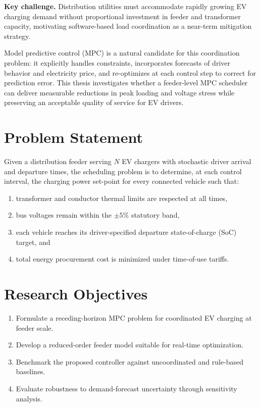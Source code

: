 \documentclass[12pt,twoside]{report}
\begin{document}
\begin{tcolorbox}[colback=kfupmsand,colframe=kfupmgreen,boxrule=0.6pt,arc=2pt,left=8pt,right=8pt,top=6pt,bottom=6pt]
\small\textbf{Key challenge.} Distribution utilities must accommodate rapidly growing EV
charging demand without proportional investment in feeder and transformer capacity, motivating
software-based load coordination as a near-term mitigation strategy.
\end{tcolorbox}

Model predictive control (MPC) is a natural candidate for this coordination problem: it
explicitly handles constraints, incorporates forecasts of driver behavior and electricity
price, and re-optimizes at each control step to correct for prediction error. This thesis
investigates whether a feeder-level MPC scheduler can deliver measurable reductions in peak
loading and voltage stress while preserving an acceptable quality of service for EV drivers.

\section{Problem Statement}
Given a distribution feeder serving $N$ EV chargers with stochastic driver arrival and
departure times, the scheduling problem is to determine, at each control interval, the charging
power set-point for every connected vehicle such that:
\begin{enumerate}[leftmargin=1.4cm]
  \item transformer and conductor thermal limits are respected at all times,
  \item bus voltages remain within the $\pm 5\%$ statutory band,
  \item each vehicle reaches its driver-specified departure state-of-charge (SoC) target, and
  \item total energy procurement cost is minimized under time-of-use tariffs.
\end{enumerate}

\section{Research Objectives}
\begin{enumerate}[leftmargin=1.4cm]
  \item Formulate a receding-horizon MPC problem for coordinated EV charging at feeder scale.
  \item Develop a reduced-order feeder model suitable for real-time optimization.
  \item Benchmark the proposed controller against uncoordinated and rule-based baselines.
  \item Evaluate robustness to demand-forecast uncertainty through sensitivity analysis.
\end{enumerate}
\end{document}
